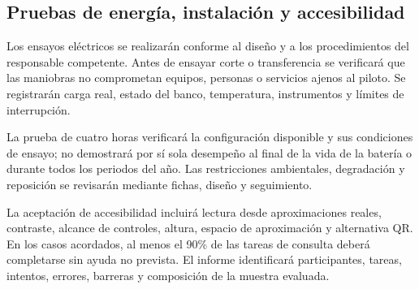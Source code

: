 \subsection{Pruebas de energía, instalación y accesibilidad}
Los ensayos eléctricos se realizarán conforme al diseño y a los procedimientos del responsable competente. Antes de ensayar corte o transferencia se verificará que las maniobras no comprometan equipos, personas o servicios ajenos al piloto. Se registrarán carga real, estado del banco, temperatura, instrumentos y límites de interrupción.


La prueba de cuatro horas verificará la configuración disponible y sus condiciones de ensayo; no demostrará por sí sola desempeño al final de la vida de la batería o durante todos los periodos del año. Las restricciones ambientales, degradación y reposición se revisarán mediante fichas, diseño y seguimiento.

La aceptación de accesibilidad incluirá lectura desde aproximaciones reales, contraste, alcance de controles, altura, espacio de aproximación y alternativa QR. En los casos acordados, al menos el 90\% de las tareas de consulta deberá completarse sin ayuda no prevista. El informe identificará participantes, tareas, intentos, errores, barreras y composición de la muestra evaluada.


